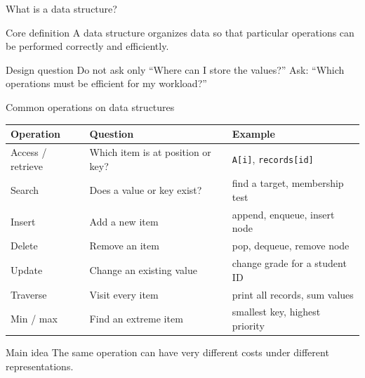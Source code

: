 \documentclass[aspectratio=169]{beamer}
\begin{document}
\begin{frame}{What is a data structure?}
\small
\begin{block}{Core definition}
A data structure organizes data so that particular operations can be performed correctly and efficiently.
\end{block}
\vspace{0.3em}
\begin{center}
\end{center}
\vspace{0.3em}
\begin{alertblock}{Design question}
Do not ask only ``Where can I store the values?'' Ask: ``Which operations must be efficient for my workload?''
\end{alertblock}
\end{frame}

\begin{frame}{Common operations on data structures}
\scriptsize
\begin{center}
\renewcommand{\arraystretch}{1.18}
\begin{tabular}{L{0.18\textwidth}L{0.34\textwidth}L{0.34\textwidth}}
\toprule
\textbf{Operation} & \textbf{Question} & \textbf{Example} \\
\midrule
Access / retrieve & Which item is at position or key? & \texttt{A[i]}, \texttt{records[id]} \\
Search & Does a value or key exist? & find a target, membership test \\
Insert & Add a new item & append, enqueue, insert node \\
Delete & Remove an item & pop, dequeue, remove node \\
Update & Change an existing value & change grade for a student ID \\
Traverse & Visit every item & print all records, sum values \\
Min / max & Find an extreme item & smallest key, highest priority \\
\bottomrule
\end{tabular}
\end{center}
\begin{alertblock}{Main idea}
The same operation can have very different costs under different representations.
\end{alertblock}
\end{frame}
\end{document}
